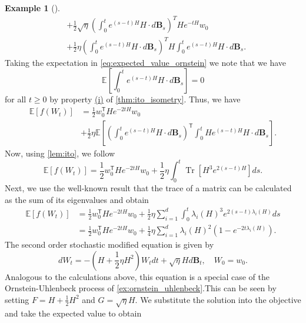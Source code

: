 \documentclass[12pt]{article}
\theoremstyle{definition}
\newtheorem{example}[example]{Example}
\numberwithin{equation}{section}
\newcommand{\T}{\mathsf{T}}
\newcommand{\ev}[1]{\mathbb{E}\left[{#1}\right]}
\DeclareMathOperator{\Tr}{Tr}
\begin{document}
\begin{example}[\autocite{liStochasticModifiedEquations2019}]
\begin{equation}
\begin{split}
    &+ \frac{1}{2} \sqrt{\eta}\left(\int_0^t e^{(s-t)H}H\cdot d\pmb{B}_s\right)^T He^{-tH}w_0 \\
    &+ \frac{1}{2} \eta \left(\int_0^t e^{(s-t)H}H\cdot d\pmb{B}_s\right)^T H\int_0^t e^{(s-t)H}H\cdot d\pmb{B}_s.
  \end{split}
\end{equation}
Taking the expectation in \eqref{eq:expected_value_ornstein} we note that we have
\begin{equation*}
  \ev{\int_0^t e^{(s-t)H}H\cdot d\pmb{B}_s} = 0
\end{equation*}
for all $t \geq 0$ by property \hyperref[item:zero_integral]{(i)} of \autoref{thm:ito_isometry}.
Thus, we have 
\begin{equation*}
  \begin{split}
  \ev{f(W_t)} &= \frac{1}{2}w_0^\T He^{-2tH}w_0 \\
  &+ \frac{1}{2} \eta \ev{ \left(\int_0^t e^{(s-t)H}H\cdot d\pmb{B}_s\right)^\T \int_0^tH e^{(s-t)H}H\cdot d\pmb{B}_s}.
  \end{split}
\end{equation*}
Now, using \autoref{lem:ito}, we follow
\begin{equation*}
  \ev{f(W_t)} = \frac{1}{2}w_0^\T He^{-2tH}w_0 + \frac{1}{2}\eta \int_0^t\Tr\left[H^3e^{2(s-t)H}\right]ds.
\end{equation*}
Next, we use the well-known result that the trace of a matrix can be calculated as the sum of its eigenvalues and obtain 
\begin{equation}
  \begin{split}
    \label{eq:analytical_expected_value}
    \ev{f(W_t)} &= \frac{1}{2}w_0^\T He^{-2tH}w_0 + \frac{1}{2}\eta \sum_{i=1}^d \int_0^t\lambda_i(H)^3e^{2(s-t)\lambda_i(H)}ds \\
    & = \frac{1}{2}w_0^\T He^{-2tH}w_0 + \frac{1}{4}\eta \sum_{i=1}^d \lambda_i(H)^2\left(1 - e^{-2t\lambda_i(H)}\right).
  \end{split}
\end{equation}
The second order stochastic modified equation is given by 
\begin{equation*}
  dW_t = -(H + \frac{1}{2}\eta H^2)W_tdt + \sqrt{\eta}Hd\mathbf{B}_t, \quad W_0 = w_0.
\end{equation*}
Analogous to the calculations above, this equation is a special case of the Ornstein-Uhlenbeck process of \autoref{ex:ornstein_uhlenbeck}.This can be seen by setting $F = H + \frac{1}{2}H^2$ and $G = \sqrt{\eta}H$. We substitute the solution into the objective and take the expected value to obtain

\end{example}
\end{document}
